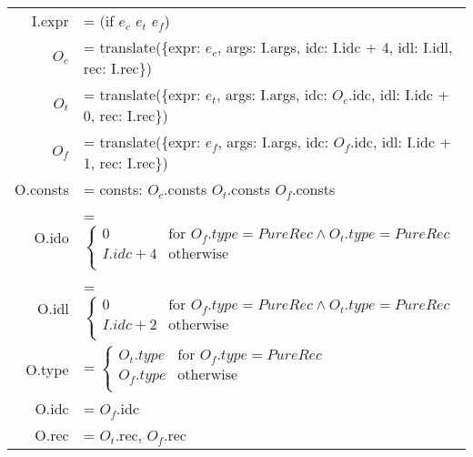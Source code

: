 \documentclass[letterpaper,12pt]{article}
\begin{document}
\medskip
\begin{tabularx}{\linewidth}{rl}
	I.expr &= (if $e_c$ $e_t$ $e_f$) \\
	$O_c$ &= translate(\{expr: $e_c$, args: I.args, idc: I.idc + 4, idl: I.idl, rec: I.rec\}) \\
	$O_t$ &= translate(\{expr: $e_t$, args: I.args, idc: $O_c$.idc, idl: I.idc + 0, rec: I.rec\}) \\
	$O_f$ &= translate(\{expr: $e_f$, args: I.args, idc: $O_f$.idc, idl: I.idc + 1, rec: I.rec\}) \\

	O.consts &= consts: $O_c$.consts $O_t$.consts $O_f$.consts \\
	O.ido &= 
	$\begin{cases}
		0 & \text{for } O_f.type = PureRec \land O_t.type = PureRec \\
		I.idc + 4 & \text{otherwise} \\
	\end{cases}$ \\

	O.idl &= 
	$\begin{cases}
		0 & \text{for } O_f.type = PureRec \land O_t.type = PureRec \\
		I.idc + 2 & \text{otherwise} \\
	\end{cases}$ \\

	O.type &= 
	$\begin{cases} 
		O_t.type & \text{for } O_f.type = PureRec \\
		O_f.type & \text{otherwise} \\
	\end{cases}$ \\
	O.idc &= $O_f$.idc \\
	O.rec &= $O_t$.rec, $O_f$.rec \\
\end{tabularx}
\end{document}
